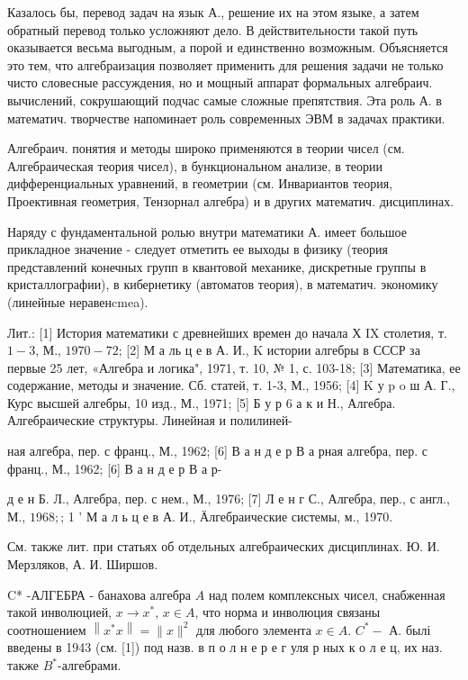 \documentclass[10pt]{article}
\begin{document}
Казалось бы, перевод задач на язык А., решение их на этом языке, а затем обратный перевод только усложняют дело. В действительности такой путь оказывается весьма выгодным, а порой и единственно возможным. Объясняется это тем, что алгебраизация позволяет применить для решения задачи не только чисто словесные рассуждения, но и мощный аппарат формальных алгебраич. вычислений, сокрушающий подчас самые сложные препятствия. Эта роль А. в математич. творчестве напоминает роль современных ЭВМ в задачах практики.



Алгебраич. понятия и методы широко применяются в теории чисел (см. Алгебраическая теория чисел), в бункциональном анализе, в теории дифференциальных уравнений, в геометрии (см. Инвариантов теория, Проективная геометрия, Тензорнал алгебра) и в других математич. дисциплинах.



Наряду с фундаментальной ролью внутри математики А. имеет большое прикладное значение - следует отметить ее выходы в физику (теория представлений конечных групп в квантовой механике, дискретные группы в кристаллографии), в кибернетику (автоматов теория), в математич. экономику (линейные неравенcmea).



Лит.: [1] История математики с древнейших времен до начала Х IX столетия, т. $1-3$, М., $1970-72$; [2] М а ль ц е в А. И., K истории алгебры в СССР за первые 25 лет, «Алгебра и логика", 1971, т. 10, № 1, с. 103-18; [3] Математика, ее содержание, методы и значение. Сб. статей, т. 1-3, М., 1956; [4] K у p o ш А. Г., Курс высшей алгебры, 10 изд., М., 1971; [5] Б у р 6 а к и Н., Алгебра. Алгебраические структуры. Линейная и полилиней-

ная алгебра, пер. с франц., М., 1962; [6] В а н д е р В а рная алгебра, пер. с франц., М., 1962; [6] В а н д е р В а р-

д е н Б. Л., Алгебра, пер. с нем., М., 1976; [7] Л е н г С., Алгебра, пер., с англ., М., $1968 ;$; 1 ' М а л ь ц е в А. И., Ӓлгебраические системы, м., 1970.



См. также лит. при статьях об отдельных алгебраических дисциплинах. Ю. И. Мерзляков, А. И. Ширшов.



C* -АЛГЕБРА - банахова алгебра $A$ над полем комплексных чисел, снабженная такой инволюцией, $x \rightarrow x^{*}$, $x \in A$, что норма и инволюция связаны соотношением $\left\|x^{*} x\right\|=\|x\|^{2}$ для любого элемента $x \in A$. $C^{*}-$ А. былі введены в 1943 (см. [1]) под назв. в п о л н е р е г уля р ных к о л е ц, их наз. также $B^{*}$-алгебрами.
\end{document}
